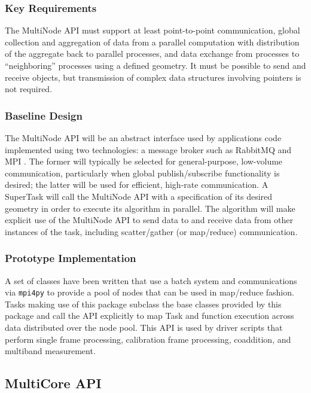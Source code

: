 \documentclass[DM,lsstdraft,toc]{lsstdoc}
\begin{document}
\subsubsection{Key Requirements}\label{multinode-reqs}

The MultiNode API must support at least point-to-point communication, global
collection and aggregation of data from a parallel computation with
distribution of the aggregate back to parallel processes, and data
exchange from processes to ``neighboring'' processes using a defined
geometry. It must be possible to send and receive objects, but
transmission of complex data structures involving pointers is not
required.

\subsubsection{Baseline Design}\label{multinode-design}

The MultiNode API will be an abstract interface used by applications code
implemented using two technologies: a message broker such as RabbitMQ
\citep{RabbitMQ} and MPI \citep{MPI}. The former will typically be selected for
general-purpose, low-volume communication, particularly when global
publish/subscribe functionality is desired; the latter will be used for
efficient, high-rate communication. A SuperTask will call the MultiNode API
with a specification of its desired geometry in order to execute its algorithm
in parallel. The algorithm will make explicit use of the MultiNode API to send
data to and receive data from other instances of the task, including
scatter/gather (or map/reduce) communication.

\subsubsection{Prototype Implementation}\label{multinode-implementation}

A set of classes have been written that use a batch system and communications
via \texttt{mpi4py} \citep{mpi4py} to provide a pool of nodes that can be used
in map/reduce fashion.  Tasks making use of this package subclass the base
classes provided by this package and call the API explicitly to map Task and
function execution across data distributed over the node pool.  This API is
used by driver scripts that perform single frame processing, calibration frame
processing, coaddition, and multiband measurement.


\subsection{MultiCore API}\label{multicore-api}
\end{document}
